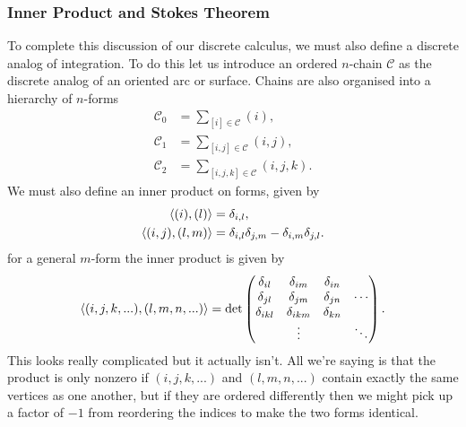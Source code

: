\documentclass[11pt, oneside]{article} %
\numberwithin{equation}{section}
\begin{document}
\subsubsection{Inner Product and Stokes Theorem}

To complete this discussion of our discrete calculus, we must also define a discrete analog of integration. To do this let us introduce an ordered $n$-chain $\mathcal C$ as the discrete analog of an oriented arc or surface. Chains are also organised into a hierarchy of $n$-forms
\begin{align}
    \mathcal C_0 &= \sum_{[i]\in \mathcal C} (i), \\
    \mathcal C_1 &= \sum_{[i,j]\in \mathcal C} (i,j), \\
    \mathcal C_2 &= \sum_{[i,j,k]\in \mathcal C} (i,j,k).
\end{align}
We must also define an inner product on forms, given by
\begin{align}
    \left \langle (i),(l) \right \rangle & = \delta_{i,l},\\
    \left \langle (i,j),(l,m) \right \rangle & = \delta_{i,l}\delta_{j,m} -\delta_{i,m}\delta_{j,l}.
\end{align}
for a general $m$-form the inner product is given by
\begin{align}\label{eqn:inner_prod_determinant}
    \left \langle (i,j,k,...),(l,m,n,...) \right \rangle = \textup{det}\begin{pmatrix}
        \delta_{il} & \delta_{im} & \delta_{in}\\
        \delta_{jl} & \delta_{jm} & \delta_{jn}& \cdots\\
        \delta_{ikl} & \delta_{ikm} & \delta_{kn}\\
        & \vdots & & \ddots
    \end{pmatrix}.
\end{align}
This looks really complicated but it actually isn't. All we're saying is that the product is only nonzero if $(i,j,k,...)$ and $(l,m,n,...)$ contain exactly the same vertices as one another, but if they are ordered differently then we might pick up a factor of $-1$ from reordering the indices to make the two forms identical. 
\end{document}
